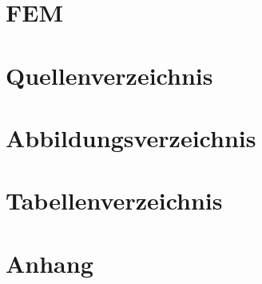 \documentclass[a4paper,twoside,11pt]{article}
\begin{document}
\section{FEM}

\newpage
\section{Quellenverzeichnis}

\newpage
\section{Abbildungsverzeichnis}
\listoffigures
\newpage
\section{Tabellenverzeichnis}
\listoftables
\newpage
\section{Anhang}

\end{document}
